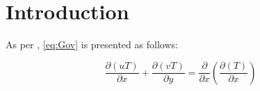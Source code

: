 
\chapter{Introduction}

As per \citep{assign}, \ref{eq:Gov} is presented as follows:

\begin{equation}
	\label{eq:Gov}	
	\frac{\partial(uT)}{\partial x}+\frac{\partial(vT)}{\partial y}= \frac{\partial}{\partial x} \left( \frac{\partial(T)}{\partial x} \right)
	
\end{equation}